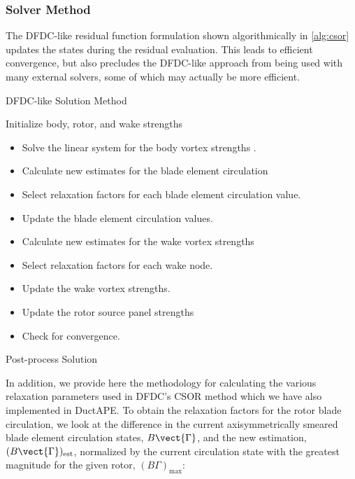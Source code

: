\subsubsection{Solver Method}
\label{sssec:dfdcsolve}

The DFDC-like residual function formulation shown algorithmically in \cref{alg:csor} updates the states during the residual evaluation.
%
This leads to efficient convergence, but also precludes the DFDC-like approach from being used with many external solvers, some of which may actually be more efficient.

\begin{algorithm}
\caption{DFDC-like Solution Method}\label{alg:csor}
\begin{algorithmic}
\State Initialize body, rotor, and wake strengths
\begin{itemize}
    \renewcommand\labelitemi{\(\cdot\)}
    \setlength{\itemindent}{1em}
    \item Solve the linear system for the body vortex strengths .
    \item Calculate new estimates for the blade element circulation 
    \item Select relaxation factors for each blade element circulation value. %
    \item Update the blade element circulation values. %
    \item Calculate new estimates for the wake vortex strengths 
    \item Select relaxation factors for each wake node. %
    \item Update the wake vortex strengths. %
    \item Update the rotor source panel strengths 
    \item Check for convergence. %
\end{itemize}
\EndWhile
\State Post-process Solution
\end{algorithmic}
\end{algorithm}

In addition, we provide here the methodology for calculating the various relaxation parameters used in DFDC's CSOR method which we have also implemented in DuctAPE.
%
To obtain the relaxation factors for the rotor blade circulation, we look at the difference in the current axisymmetrically smeared blade element circulation states,
\(B\vect{\Gamma}\), and the new estimation,
\((B\vect{\Gamma})_\text{est}\), normalized by the current circulation state with the greatest magnitude for the given rotor, \((B\Gamma)_\text{max}\):

